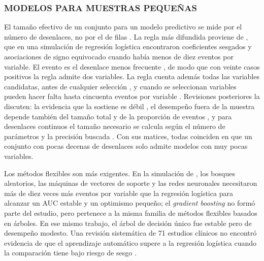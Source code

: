 \subsubsection{MODELOS PARA MUESTRAS PEQUEÑAS}

El tamaño efectivo de un conjunto para un modelo predictivo se mide por el número de desenlaces, no por el de filas \parencite{RileyPartII2019}. La regla más difundida proviene de \textcite{Peduzzi1996}, que en una simulación de regresión logística encontraron coeficientes sesgados y asociaciones de signo equivocado cuando había menos de diez eventos por variable. El evento es el desenlace menos frecuente \parencite{vanSmeden2016}, de modo que con veinte casos positivos la regla admite dos variables. La regla cuenta además todas las variables candidatas, antes de cualquier selección \parencite{RileyPartII2019}, y cuando se seleccionan variables pueden hacer falta hasta cincuenta eventos por variable \parencite{Wynants2015}. Revisiones posteriores la discuten: la evidencia que la sostiene es débil \parencite{vanSmeden2016}, el desempeño fuera de la muestra depende también del tamaño total y de la proporción de eventos \parencite{vanSmeden2019}, y para desenlaces continuos el tamaño necesario se calcula según el número de parámetros y la precisión buscada \parencite{RileyPartI2019}. Con sus matices, todas coinciden en que un conjunto con pocas decenas de desenlaces solo admite modelos con muy pocas variables.

Los métodos flexibles son más exigentes. En la simulación de \textcite{vanderPloeg2014}, los bosques aleatorios, las máquinas de vectores de soporte y las redes neuronales necesitaron más de diez veces más eventos por variable que la regresión logística para alcanzar un AUC estable y un optimismo pequeño; el \textit{gradient boosting} no formó parte del estudio, pero pertenece a la misma familia de métodos flexibles basados en árboles. En ese mismo trabajo, el árbol de decisión único fue estable pero de desempeño modesto. Una revisión sistemática de 71 estudios clínicos no encontró evidencia de que el aprendizaje automático supere a la regresión logística cuando la comparación tiene bajo riesgo de sesgo \parencite{Christodoulou2019}.

